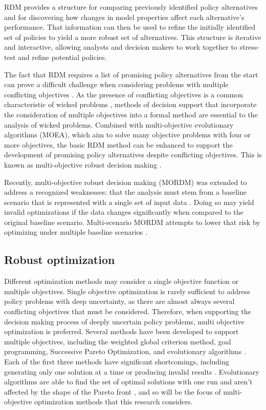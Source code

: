     RDM provides a structure for comparing previously identified policy alternatives and for discovering how changes in model properties affect each alternative's performance. That information can then be used to refine the initially identified set of policies to yield a more robust set of alternatives. This structure is iterative and interactive, allowing analysts and decision makers to work together to stress-test and refine potential policies. 
    
    The fact that RDM requires a list of promising policy alternatives from the start can prove a difficult challenge when considering problems with multiple conflicting objectives \citep{Kasprzyk2013}. As the presence of conflicting objectives is a common characteristic of wicked problems \citep{Rittel1973}, methods of decision support that incorporate the consideration of multiple objectives into a formal method are essential to the analysis of wicked problems. Combined with multi-objective evolutionary algorithms (MOEA), which aim to solve many objective problems with four or more objectives, the basic RDM method can be enhanced to support the development of promising policy alternatives despite conflicting objectives. This is known as multi-objective robust decision making \citep{Kasprzyk2013}. 
    
    Recently, multi-objective robust decision making (MORDM) was extended to address a recognized weaknesses: that the analysis must stem from a baseline scenario that is represented with a single set of input data \citep{Watson2017}. Doing so may yield invalid optimizations if the data changes significantly when compared to the original baseline scenario. Multi-scenario MORDM attempts to lower that risk by optimizing under multiple baseline scenarios \citep{Watson2017}.

    \subsection{Robust optimization}
    Different optimization methods may consider a single objective function or multiple objectives. Single objective optimization is rarely sufficient to address policy problems with deep uncertainty, as there are almost always several conflicting objectives that must be considered. Therefore, when supporting the decision making process of deeply uncertain policy problems, multi objective optimization is preferred. Several methods have been developed to support multiple objectives, including the weighted global criterion method, goal programming, Successive Pareto Optimization, and evolutionary algorithms \citep{Coello2006,Marler2004}. Each of the first three methods have significant shortcomings, including generating only one solution at a time or producing invalid results \citep{Coello2006}. Evolutionary algorithms are able to find the set of optimal solutions with one run and aren't affected by the shape of the Pareto front \citep{Coello2006}, and so will be the focus of multi-objective optimization methods that this research considers. 
    
